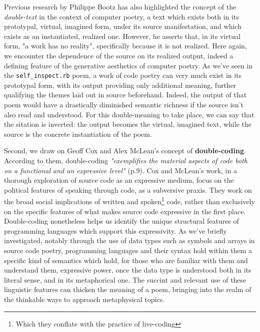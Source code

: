 \documentclass{article}
\begin{document}
Previous research by Philippe Bootz has also highlighted the concept of the \emph{double-text} in the context of computer poetry, a text which exists both in its prototypal, virtual, imagined form, under its source manifestation, and which exists as an instantiated, realized one\cite{bootz_problem_2005}. However, he asserts that, in its virtual form, "a work has no reality", specifically because  it is not realized. Here again, we encounter the dependence of the source on its realized output, indeed a defining feature of the generative aesthetics of computer poetry. As we've seen in the \lstinline{self_inspect.rb} poem, a work of code poetry can very much exist in its prototypal form, with its output providing only additional meaning, further qualifying the themes laid out in source beforehand. Indeed, the output of that poem would have a drastically diminished semantic richness if the source isn't also read and understood. For this double-meaning to take place, we can say that the sitation is inverted: the output becomes the virtual, imagined text, while the source is the concrete instantiation of the poem.

Second, we draw on Geoff Cox and Alex McLean's concept of \textbf{double-coding}\cite{cox_speaking_2013}. According to them, double-coding \emph{"exemplifies the material aspects of code both on a functional and an expressive level"} (p.9). Cox and McLean's work, in a thorough exploration of source code as an expressive medium, focus on the political features of speaking through code, as a subversive praxis. They work on the broad social implications of written and spoken\footnote{Which they conflate with the practice of live-coding} code, rather than exclusively on the specific features of what makes source code expressive in the first place. Double-coding nonetheless helps us identify the unique structural features of programming languages which support this expressivity. As we've briefly investigated, notably through the use of data types such as symbols and arrays in source code poetry, programming languages and their syntax hold within them a specific kind of semantics which hold, for those who are familiar with them and understand them, expressive power, once the data type is understood both in its literal sense, and in its metaphorical one. The succint and relevant use of these linguistic features can thicken the meaning of a poem, bringing into the realm of the thinkable ways to approach metaphysical topics.
\end{document}
